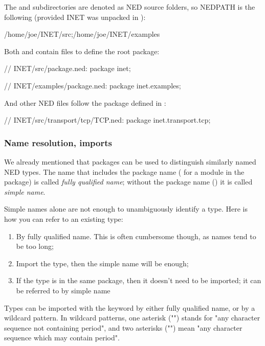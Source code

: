 The  and  subdirectories are denoted as NED source
folders, so NEDPATH is the following (provided INET was unpacked in
):

\begin{filelisting}
/home/joe/INET/src;/home/joe/INET/examples
\end{filelisting}

Both  and  contain  files to
define the root package:

\begin{ned}
// INET/src/package.ned:
package inet;
\end{ned}

\begin{ned}
// INET/examples/package.ned:
package inet.examples;
\end{ned}

And other NED files follow the package defined in :

\begin{ned}
// INET/src/transport/tcp/TCP.ned:
package inet.transport.tcp;
\end{ned}


\subsubsection{Name resolution, imports}

We already mentioned that packages can be used to distinguish
similarly named NED types. The name that includes the package name
( for a  module in the 
package) is called \textit{fully qualified name}; without the package
name () it is called \textit{simple name}.

Simple names alone are not enough to unambiguously identify a type.
Here is how you can refer to an existing type:

\begin{enumerate}
  \item By fully qualified name. This is often cumbersome though,
        as names tend to be too long;
  \item Import the type, then the simple name will be enough;
  \item If the type is in the same package, then it doesn't need to be
        imported; it can be referred to by simple name
\end{enumerate}

Types can be imported with the  keyword by either
fully qualified name, or by a wildcard pattern. In wildcard patterns,
one asterisk ("\ttt{*}") stands for "any character sequence not containing
period", and two asterisks ("\ttt{**}") mean "any character sequence which may
contain period".

